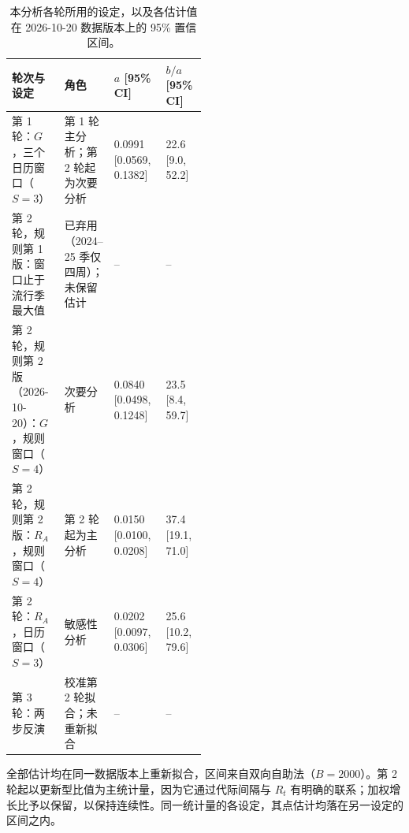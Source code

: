 \begin{table}[htbp]
\centering
\footnotesize
\setlength{\tabcolsep}{4pt}
\caption{本分析各轮所用的设定，以及各估计值在 2026-10-20 数据版本上的 95\% 置信区间。}
\label{tab:s9}
\begin{tabular}{p{0.27\linewidth}p{0.22\linewidth}ll}
\toprule
轮次与设定 & 角色 & $a$ [95\% CI] & $b/a$ [95\% CI] \\
\midrule
第 1 轮：$G$，三个日历窗口（$S=3$） & 第 1 轮主分析；第 2 轮起为次要分析 & 0.0991 [0.0569, 0.1382] & 22.6 [9.0, 52.2] \\
第 2 轮，规则第 1 版：窗口止于流行季最大值 & 已弃用（2024--25 季仅四周）；未保留估计 & -- & -- \\
第 2 轮，规则第 2 版（2026-10-20）：$G$，规则窗口（$S=4$） & 次要分析 & 0.0840 [0.0498, 0.1248] & 23.5 [8.4, 59.7] \\
第 2 轮，规则第 2 版：$R_A$，规则窗口（$S=4$） & 第 2 轮起为主分析 & 0.0150 [0.0100, 0.0208] & 37.4 [19.1, 71.0] \\
第 2 轮：$R_A$，日历窗口（$S=3$） & 敏感性分析 & 0.0202 [0.0097, 0.0306] & 25.6 [10.2, 79.6] \\
第 3 轮：两步反演 & 校准第 2 轮拟合；未重新拟合 & -- & -- \\
\bottomrule
\end{tabular}
\par\smallskip
\begin{minipage}{0.95\linewidth}\scriptsize 全部估计均在同一数据版本上重新拟合，区间来自双向自助法（$B=2000$）。第 2 轮起以更新型比值为主统计量，因为它通过代际间隔与 $R_t$ 有明确的联系；加权增长比予以保留，以保持连续性。同一统计量的各设定，其点估计均落在另一设定的区间之内。\end{minipage}
\end{table}
